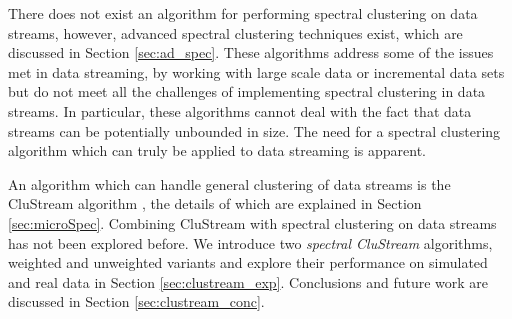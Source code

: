 There does not exist an algorithm for performing spectral clustering on data streams, however, advanced spectral clustering techniques exist, which are discussed in Section \ref{sec:ad_spec}. These algorithms address some of the issues met in data streaming, by working with large scale data or incremental data sets but do not meet all the challenges of implementing spectral clustering in data streams. In particular, these algorithms cannot deal with the fact that data streams can be potentially unbounded in size. The need for a spectral clustering algorithm which can truly be applied to data streaming is apparent.

An algorithm which can handle general clustering of data streams is the CluStream algorithm \citep{Aggarwal2003}, the details of which are explained in Section \ref{sec:microSpec}. Combining CluStream with spectral clustering on data streams has not been explored before.  We introduce two \textit{spectral CluStream} algorithms,  weighted and unweighted variants and explore their performance on simulated and real data in Section \ref{sec:clustream_exp}. Conclusions and future work are discussed in Section \ref{sec:clustream_conc}.




